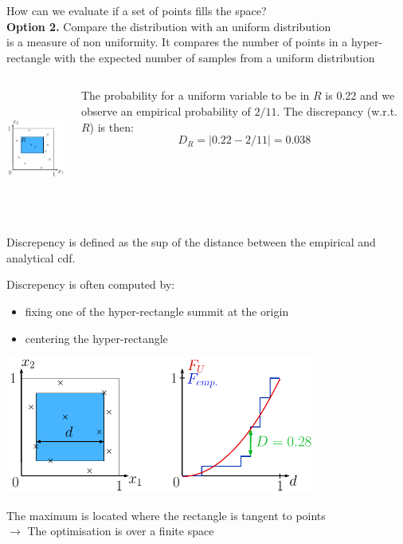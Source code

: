 \documentclass{beamer}
\begin{document}
\begin{frame}{}
How can we evaluate if a set of points fills the space?\\ \vspace{2mm}
\textbf{Option 2.} Compare the distribution with an uniform distribution\\ \vspace{2mm}
 is a measure of non uniformity. It compares the number of points in a hyper-rectangle with the expected number of samples from a uniform distribution
\vspace{-2mm}
\begin{columns}[c]
\column{4cm}
\begin{center}
\includegraphics[height=4cm]{figures/latexdraw/discrepency}
\end{center}
\column{6cm}
\vspace{1mm} 
The probability for a uniform variable to be in $R$ is 0.22 and we observe an empirical probability of $2/11$. The discrepancy (w.r.t. $R$) is then:
$$D_R = |0.22-2/11| = 0.038$$
\end{columns}
\vspace{2mm}
Discrepency is defined as the sup of the distance between the empirical and analytical cdf.
\end{frame}

\begin{frame}{}
Discrepency is often computed by:
\begin{itemize}
 	\item fixing one of the hyper-rectangle summit at the origin
 	\item centering the hyper-rectangle
 \end{itemize} 
\begin{center}
\includegraphics[height=4.5cm]{figures/latexdraw/discrepency3}
\end{center}
The maximum is located where the rectangle is tangent to points\\
$\rightarrow$ The optimisation is over a finite space
\end{frame}
\end{document}

